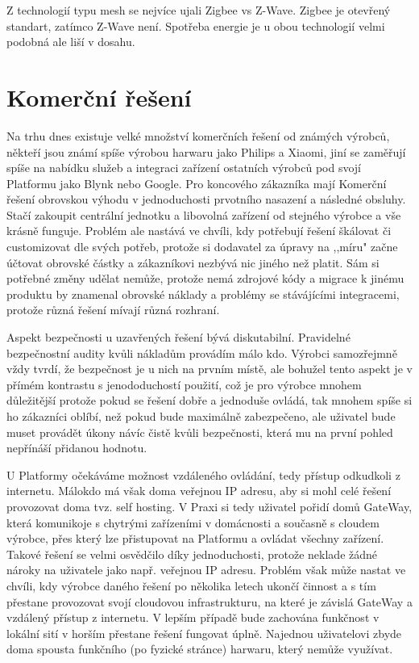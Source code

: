\documentclass[thesis=B,czech]{FITthesis}[2019/12/23]
\begin{document}
    Z technologií typu mesh se nejvíce ujali Zigbee vs Z-Wave. Zigbee je otevřený standart, zatímco Z-Wave není. Spotřeba energie je u obou technologií velmi podobná ale liší v dosahu.



\section{Komerční řešení} %
Na trhu dnes existuje velké množství komerčních řešení od známých výrobců, někteří jsou známí spíše výrobou harwaru jako Philips a Xiaomi, jiní se zaměřují spíše na nabídku služeb a integraci zařízení ostatních výrobců pod svojí Platformu jako Blynk nebo Google. Pro koncového zákazníka mají Komerční řešení obrovskou výhodu v jednoduchosti prvotního nasazení a následné obsluhy. Stačí zakoupit centrální jednotku a libovolná zařízení od stejného výrobce a vše krásně funguje. Problém ale nastává ve chvíli, kdy potřebují řešení škálovat či customizovat dle svých potřeb, protože si dodavatel za úpravy na ,,míru" začne účtovat obrovské částky a zákazníkovi nezbývá nic jiného než platit. Sám si potřebné změny udělat nemůže, protože nemá zdrojové kódy a migrace k jinému produktu by znamenal obrovské náklady a problémy se stávájícími integracemi, protože různá řešení mívají různá rozhraní.
  
Aspekt bezpečnosti u uzavřených řešení bývá diskutabilní. Pravidelné bezpečnostní audity kvůli nákladům provádím málo kdo. Výrobci samozřejmně vždy tvrdí, že bezpečnost je u nich na prvním místě, ale bohužel tento aspekt je v přímém kontrastu s jenododuchostí použití, což je pro výrobce mnohem důležitější protože pokud se řešení dobře a jednoduše ovládá, tak mnohem spíše si ho zákazníci oblíbí, než pokud bude maximálně zabezpečeno, ale uživatel bude muset provádět úkony návíc čistě kvůli bezpečnosti, která mu na první pohled nepřínáší přidanou hodnotu.

U Platformy očekáváme možnost vzdáleného ovládání, tedy přístup odkudkoli z internetu. Málokdo má však doma veřejnou IP adresu, aby si mohl celé řešení provozovat doma tvz. self hosting. V Praxi si tedy uživatel pořidí domů GateWay, která komunikoje s chytrými zařízeními v domácnosti a současně s cloudem výrobce, přes který lze přistupovat na Platformu a ovládat všechny zařízení. Takové řešení se velmi osvědčilo díky jednoduchosti, protože neklade žádné nároky na uživatele jako např. veřejnou IP adresu. Problém však může nastat ve chvíli, kdy výrobce daného řešení po několika letech ukončí činnost a s tím přestane provozovat svojí cloudovou infrastrukturu, na které je závislá GateWay a vzdálený přístup z internetu. V lepším případě bude zachována funkčnost v lokální sití v horším přestane řešení fungovat úplně. Najednou uživatelovi zbyde doma spousta funkčního (po fyzické stránce) harwaru, který nemůže využívat.
\end{document}
